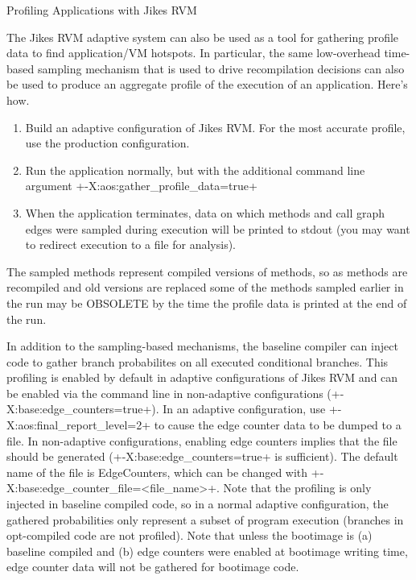 \begin{chapter}{Profiling Applications with Jikes RVM}
\label{cha:profilingapplicationswithjikesrvm}

The Jikes RVM adaptive system can also be used as a tool for gathering profile data to find application/VM hotspots. In particular, the same low-overhead time-based sampling mechanism that is used to drive recompilation decisions can also be used to produce an aggregate profile of the execution of an application. Here's how.

\begin{enumerate}
  \item Build an adaptive configuration of Jikes RVM. For the most accurate profile, use the production configuration.
  \item Run the application normally, but with the additional command line argument \spverb+-X:aos:gather_profile_data=true+
  \item When the application terminates, data on which methods and call graph edges were sampled during execution will be printed to stdout (you may want to redirect execution to a file for analysis).
\end{enumerate}

The sampled methods represent compiled versions of methods, so as methods are recompiled and old versions are replaced some of the methods sampled earlier in the run may be OBSOLETE by the time the profile data is printed at the end of the run.

In addition to the sampling-based mechanisms, the baseline compiler can inject code to gather branch probabilites on all executed conditional branches. This profiling is enabled by default in adaptive configurations of Jikes RVM and can be enabled via the command line in non-adaptive configurations (\spverb+-X:base:edge_counters=true+). In an adaptive configuration, use \newline \spverb+-X:aos:final_report_level=2+ to cause the edge counter data to be dumped to a file. In non-adaptive configurations, enabling edge counters implies that the file should be generated (\spverb+-X:base:edge_counters=true+ is sufficient). The default name of the file is EdgeCounters, which can be changed with \newline \spverb+-X:base:edge_counter_file=<file_name>+. Note that the profiling is only injected in baseline compiled code, so in a normal adaptive configuration, the gathered probabilities only represent a subset of program execution (branches in opt-compiled code are not profiled). Note that unless the bootimage is (a) baseline compiled and (b) edge counters were enabled at bootimage writing time, edge counter data will not be gathered for bootimage code.


\end{chapter}
